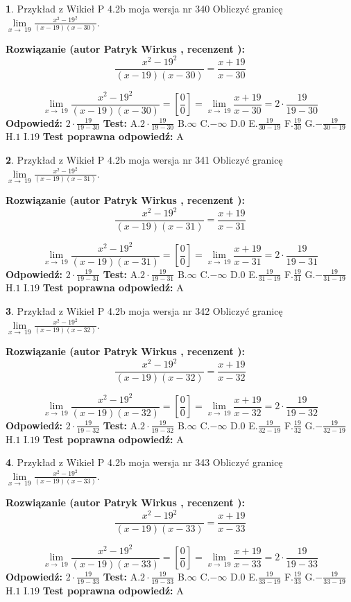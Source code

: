\documentclass[12pt, a4paper]{article}
\theoremstyle{definition} %
\newtheorem{zad}{}
\newcommand{\zadStart}[1]{\begin{zad}#1\newline}
\newcommand{\zadStop}{\end{zad}}
\newcommand{\rozwStart}[2]{\noindent \textbf{Rozwiązanie (autor #1 , recenzent #2): }\newline}
\newcommand{\rozwStop}{\newline}
\newcommand{\odpStart}{\noindent \textbf{Odpowiedź:}\newline}
\newcommand{\odpStop}{\newline}
\newcommand{\testStart}{\noindent \textbf{Test:}\newline}
\newcommand{\testStop}{\newline}
\newcommand{\kluczStart}{\noindent \textbf{Test poprawna odpowiedź:}\newline}
\newcommand{\kluczStop}{\newline}
\begin{document}
\zadStart{Przykład z Wikieł P 4.2b moja wersja nr 340}
Obliczyć granicę $\lim\limits_{x\to\ 19}\frac{x^{2}-19^{2}}{(x-19)(x-30)}$.
\zadStop
\rozwStart{Patryk Wirkus}{}
$$\frac{x^{2}-19^{2}}{(x-19)(x-30)}=\frac{x+19}{x-30}$$

$$\lim\limits_{x\to\ 19}\frac{x^{2}-19^{2}}{(x-19)(x-30)}=[\frac{0}{0}]=\lim\limits_{x\to\ 19}\frac{x+19}{x-30}=2 \cdot \frac{19}{19-30}$$
\rozwStop
\odpStart
$2 \cdot \frac{19}{19-30}$
\odpStop
\testStart
A.$2 \cdot \frac{19}{19-30}$
B.$\infty$
C.$-\infty$
D.$0$
E.$\frac{19}{30-19}$
F.$\frac{19}{30}$
G.$-\frac{19}{30-19}$
H.$1$
I.$19$
\testStop
\kluczStart
A
\kluczStop



\zadStart{Przykład z Wikieł P 4.2b moja wersja nr 341}
Obliczyć granicę $\lim\limits_{x\to\ 19}\frac{x^{2}-19^{2}}{(x-19)(x-31)}$.
\zadStop
\rozwStart{Patryk Wirkus}{}
$$\frac{x^{2}-19^{2}}{(x-19)(x-31)}=\frac{x+19}{x-31}$$

$$\lim\limits_{x\to\ 19}\frac{x^{2}-19^{2}}{(x-19)(x-31)}=[\frac{0}{0}]=\lim\limits_{x\to\ 19}\frac{x+19}{x-31}=2 \cdot \frac{19}{19-31}$$
\rozwStop
\odpStart
$2 \cdot \frac{19}{19-31}$
\odpStop
\testStart
A.$2 \cdot \frac{19}{19-31}$
B.$\infty$
C.$-\infty$
D.$0$
E.$\frac{19}{31-19}$
F.$\frac{19}{31}$
G.$-\frac{19}{31-19}$
H.$1$
I.$19$
\testStop
\kluczStart
A
\kluczStop



\zadStart{Przykład z Wikieł P 4.2b moja wersja nr 342}
Obliczyć granicę $\lim\limits_{x\to\ 19}\frac{x^{2}-19^{2}}{(x-19)(x-32)}$.
\zadStop
\rozwStart{Patryk Wirkus}{}
$$\frac{x^{2}-19^{2}}{(x-19)(x-32)}=\frac{x+19}{x-32}$$

$$\lim\limits_{x\to\ 19}\frac{x^{2}-19^{2}}{(x-19)(x-32)}=[\frac{0}{0}]=\lim\limits_{x\to\ 19}\frac{x+19}{x-32}=2 \cdot \frac{19}{19-32}$$
\rozwStop
\odpStart
$2 \cdot \frac{19}{19-32}$
\odpStop
\testStart
A.$2 \cdot \frac{19}{19-32}$
B.$\infty$
C.$-\infty$
D.$0$
E.$\frac{19}{32-19}$
F.$\frac{19}{32}$
G.$-\frac{19}{32-19}$
H.$1$
I.$19$
\testStop
\kluczStart
A
\kluczStop



\zadStart{Przykład z Wikieł P 4.2b moja wersja nr 343}
Obliczyć granicę $\lim\limits_{x\to\ 19}\frac{x^{2}-19^{2}}{(x-19)(x-33)}$.
\zadStop
\rozwStart{Patryk Wirkus}{}
$$\frac{x^{2}-19^{2}}{(x-19)(x-33)}=\frac{x+19}{x-33}$$

$$\lim\limits_{x\to\ 19}\frac{x^{2}-19^{2}}{(x-19)(x-33)}=[\frac{0}{0}]=\lim\limits_{x\to\ 19}\frac{x+19}{x-33}=2 \cdot \frac{19}{19-33}$$
\rozwStop
\odpStart
$2 \cdot \frac{19}{19-33}$
\odpStop
\testStart
A.$2 \cdot \frac{19}{19-33}$
B.$\infty$
C.$-\infty$
D.$0$
E.$\frac{19}{33-19}$
F.$\frac{19}{33}$
G.$-\frac{19}{33-19}$
H.$1$
I.$19$
\testStop
\kluczStart
A
\kluczStop
\end{document}
